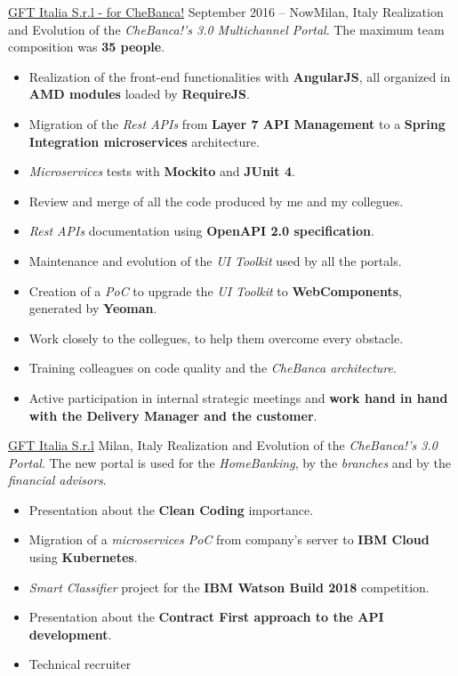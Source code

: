 \documentclass[10pt,a4paper]{altacv}
\begin{document}
\begin{adjustwidth}{0cm}{-8cm}
\divider

{\href{https://www.chebanca.it/}{GFT Italia S.r.l - for CheBanca!}}
{September 2016 -- Now}{Milan, Italy}
Realization and Evolution of the \textit{CheBanca!'s 3.0 Multichannel Portal}.
\newline
The maximum team composition was \textbf{35 people}.
\newline
\begin{itemize}
	\item Realization of the front-end functionalities with \textbf{AngularJS}, all organized in \textbf{AMD modules} loaded by \textbf{RequireJS}.
	\item Migration of the \textit{Rest APIs} from \textbf{Layer 7 API Management} to a \textbf{Spring Integration microservices} architecture.
	\item \textit{Microservices} tests with \textbf{Mockito} and \textbf{JUnit 4}.
	\item Review and merge of all the code produced by me and my collegues.
	\item \textit{Rest APIs} documentation using \textbf{OpenAPI 2.0 specification}.
	\item Maintenance and evolution of the \textit{UI Toolkit} used by all the portals.
	\item Creation of a \textit{PoC} to upgrade the \textit{UI Toolkit} to \textbf{WebComponents}, generated by \textbf{Yeoman}.
	\item Work closely to the collegues, to help them overcome every obstacle.
	\item Training colleagues on code quality and the \textit{CheBanca architecture}.
	\item Active participation in internal strategic meetings and \textbf{work hand in hand with the Delivery Manager and the customer}.
\end{itemize}

\divider

{\href{https://www.gft.com/it/it/index/}{GFT Italia S.r.l}}
{Milan, Italy}
Realization and Evolution of the \textit{CheBanca!'s 3.0 Portal}. 
\newline
The new portal is used for the \textit{HomeBanking}, by the \textit{branches} and by the \textit{financial advisors}.
\newline
\begin{itemize}
	\item Presentation about the \textbf{Clean Coding} importance.
	\item Migration of a \textit{microservices PoC} from company's server to \textbf{IBM Cloud} using \textbf{Kubernetes}.
	\item \textit{Smart Classifier} project for the \textbf{IBM Watson Build 2018} competition.
	\item Presentation about the \textbf{Contract First approach to the API development}.
	\item Technical recruiter
\end{itemize}


\end{adjustwidth}
\end{document}
